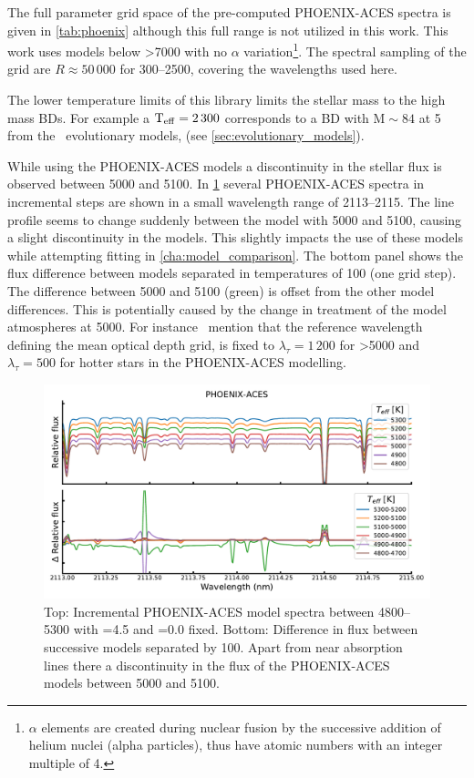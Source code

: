 The full parameter grid space of the pre-computed {PHOENIX-ACES} spectra is given in \cref{tab:phoenix} although this full range is not utilized in this work.
This work uses models below >7000\K{} with no \(\alpha\) variation\footnote{$\alpha$ elements are created during nuclear fusion by the successive addition of helium nuclei (alpha particles), thus have atomic numbers with an integer multiple of 4.}.
The spectral sampling of the grid are $R \approx 50\,000$ for 300--2500\nm, covering the wavelengths used here.



The lower temperature limits of this library limits the stellar mass to the high mass BDs.
For example a \(\textrm{T}_{\mathrm{eff}}{}=2\,300\)\K{} corresponds to a {BD} with \(\textrm{M}\sim84\)\Mjup{} at 5\Gyr{} from the~\citet{baraffe_evolutionary_2003} evolutionary models, (see \cref{sec:evolutionary_models}).


While using the {PHOENIX-ACES} models a discontinuity in the stellar flux is observed between 5000\K{} and 5100\K{}.
In \cref{fig:phoenixdiffereceat5000k} several {PHOENIX-ACES} spectra in incremental steps are shown in a small wavelength range of 2113--2115\nm{}.
The line profile seems to change suddenly between the model with 5000\K{} and 5100\K{}, causing a slight discontinuity in the models.
This slightly impacts the use of these models while attempting \textchisquared{} fitting in \cref{cha:model_comparison}.
The bottom panel shows the flux difference between models separated in temperatures of 100\K{} (one grid step).
The difference between 5000 and 5100\K{} (green) is offset from the other model differences.
This is potentially caused by the change in treatment of the model atmospheres at 5000\K{}.
For instance~\citet{husser_new_2013} mention that the reference wavelength defining the mean optical depth grid, is fixed to $\lambda_{\tau}=1\,200$\nm{} for \Teff{}>5000\K{} and $\lambda_{\tau}=500$\nm{} for hotter stars in the {PHOENIX-ACES} modelling.

\begin{figure}
    \centering
    \includegraphics[width=0.7\linewidth]{figures/atmos_and_models/phoenix_differece_at_5000K}
    \caption[Difference in successive {PHOENIX-ACES} spectra around 5000\K.]{Top: Incremental {PHOENIX-ACES} model spectra between 4800--5300\K{} with \logg{}=4.5 and \feh{}=0.0 fixed.
    Bottom: Difference in flux between successive models separated by 100\K{}.
    Apart from near absorption lines there a discontinuity in the flux of the {PHOENIX-ACES} models between 5000 and 5100\K{}.}
    \label{fig:phoenixdiffereceat5000k}
\end{figure}


